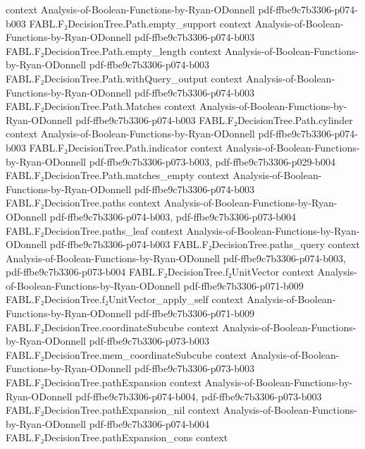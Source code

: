 \begin{theorem}
  {context}
  {Analysis-of-Boolean-Functions-by-Ryan-ODonnell}
  {pdf-ffbe9c7b3306-p074-b003}
\proofstep
  {FABL.F₂DecisionTree.Path.empty_support}
  {context}
  {Analysis-of-Boolean-Functions-by-Ryan-ODonnell}
  {pdf-ffbe9c7b3306-p074-b003}
\proofstep
  {FABL.F₂DecisionTree.Path.empty_length}
  {context}
  {Analysis-of-Boolean-Functions-by-Ryan-ODonnell}
  {pdf-ffbe9c7b3306-p074-b003}
\proofstep
  {FABL.F₂DecisionTree.Path.withQuery_output}
  {context}
  {Analysis-of-Boolean-Functions-by-Ryan-ODonnell}
  {pdf-ffbe9c7b3306-p074-b003}
\proofstep
  {FABL.F₂DecisionTree.Path.Matches}
  {context}
  {Analysis-of-Boolean-Functions-by-Ryan-ODonnell}
  {pdf-ffbe9c7b3306-p074-b003}
\proofstep
  {FABL.F₂DecisionTree.Path.cylinder}
  {context}
  {Analysis-of-Boolean-Functions-by-Ryan-ODonnell}
  {pdf-ffbe9c7b3306-p074-b003}
\proofstep
  {FABL.F₂DecisionTree.Path.indicator}
  {context}
  {Analysis-of-Boolean-Functions-by-Ryan-ODonnell}
  {pdf-ffbe9c7b3306-p073-b003,
    pdf-ffbe9c7b3306-p029-b004}
\proofstep
  {FABL.F₂DecisionTree.Path.matches_empty}
  {context}
  {Analysis-of-Boolean-Functions-by-Ryan-ODonnell}
  {pdf-ffbe9c7b3306-p074-b003}
\proofstep
  {FABL.F₂DecisionTree.paths}
  {context}
  {Analysis-of-Boolean-Functions-by-Ryan-ODonnell}
  {pdf-ffbe9c7b3306-p074-b003,
    pdf-ffbe9c7b3306-p073-b004}
\proofstep
  {FABL.F₂DecisionTree.paths_leaf}
  {context}
  {Analysis-of-Boolean-Functions-by-Ryan-ODonnell}
  {pdf-ffbe9c7b3306-p074-b003}
\proofstep
  {FABL.F₂DecisionTree.paths_query}
  {context}
  {Analysis-of-Boolean-Functions-by-Ryan-ODonnell}
  {pdf-ffbe9c7b3306-p074-b003,
    pdf-ffbe9c7b3306-p073-b004}
\proofstep
  {FABL.F₂DecisionTree.f₂UnitVector}
  {context}
  {Analysis-of-Boolean-Functions-by-Ryan-ODonnell}
  {pdf-ffbe9c7b3306-p071-b009}
\proofstep
  {FABL.F₂DecisionTree.f₂UnitVector_apply_self}
  {context}
  {Analysis-of-Boolean-Functions-by-Ryan-ODonnell}
  {pdf-ffbe9c7b3306-p071-b009}
\proofstep
  {FABL.F₂DecisionTree.coordinateSubcube}
  {context}
  {Analysis-of-Boolean-Functions-by-Ryan-ODonnell}
  {pdf-ffbe9c7b3306-p073-b003}
\proofstep
  {FABL.F₂DecisionTree.mem_coordinateSubcube}
  {context}
  {Analysis-of-Boolean-Functions-by-Ryan-ODonnell}
  {pdf-ffbe9c7b3306-p073-b003}
\proofstep
  {FABL.F₂DecisionTree.pathExpansion}
  {context}
  {Analysis-of-Boolean-Functions-by-Ryan-ODonnell}
  {pdf-ffbe9c7b3306-p074-b004,
    pdf-ffbe9c7b3306-p073-b003}
\proofstep
  {FABL.F₂DecisionTree.pathExpansion_nil}
  {context}
  {Analysis-of-Boolean-Functions-by-Ryan-ODonnell}
  {pdf-ffbe9c7b3306-p074-b004}
\proofstep
  {FABL.F₂DecisionTree.pathExpansion_cons}
  {context}

\end{theorem}
